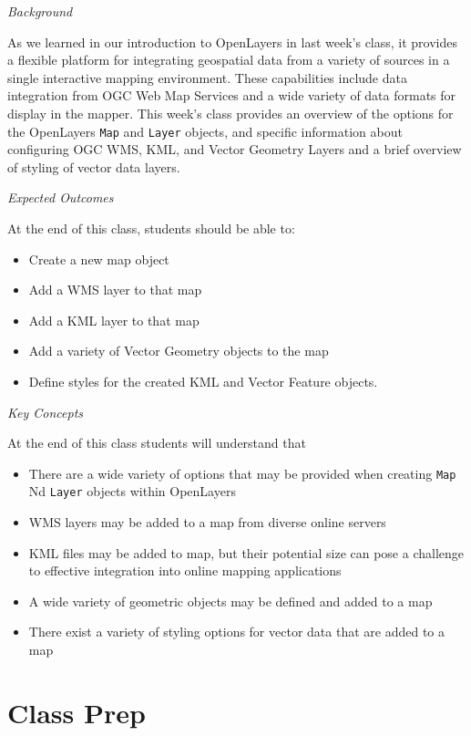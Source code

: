 \documentclass[]{book}
\providecommand{\tightlist}{%
  \setlength{\itemsep}{0pt}\setlength{\parskip}{0pt}}
\begin{document}
\emph{Background}

As we learned in our introduction to OpenLayers in last week's class, it
provides a flexible platform for integrating geospatial data from a
variety of sources in a single interactive mapping environment. These
capabilities include data integration from OGC Web Map Services and a
wide variety of data formats for display in the mapper. This week's
class provides an overview of the options for the OpenLayers
\texttt{Map} and \texttt{Layer} objects, and specific information about
configuring OGC WMS, KML, and Vector Geometry Layers and a brief
overview of styling of vector data layers.

\emph{Expected Outcomes}

At the end of this class, students should be able to:

\begin{itemize}
\tightlist
\item
  Create a new map object
\item
  Add a WMS layer to that map
\item
  Add a KML layer to that map
\item
  Add a variety of Vector Geometry objects to the map
\item
  Define styles for the created KML and Vector Feature objects.
\end{itemize}

\emph{Key Concepts }

At the end of this class students will understand that

\begin{itemize}
\tightlist
\item
  There are a wide variety of options that may be provided when creating
  \texttt{Map} Nd \texttt{Layer} objects within OpenLayers
\item
  WMS layers may be added to a map from diverse online servers
\item
  KML files may be added to map, but their potential size can pose a
  challenge to effective integration into online mapping applications
\item
  A wide variety of geometric objects may be defined and added to a map
\item
  There exist a variety of styling options for vector data that are
  added to a map
\end{itemize}

\section{Class Prep}\label{week11-prep}
\end{document}
